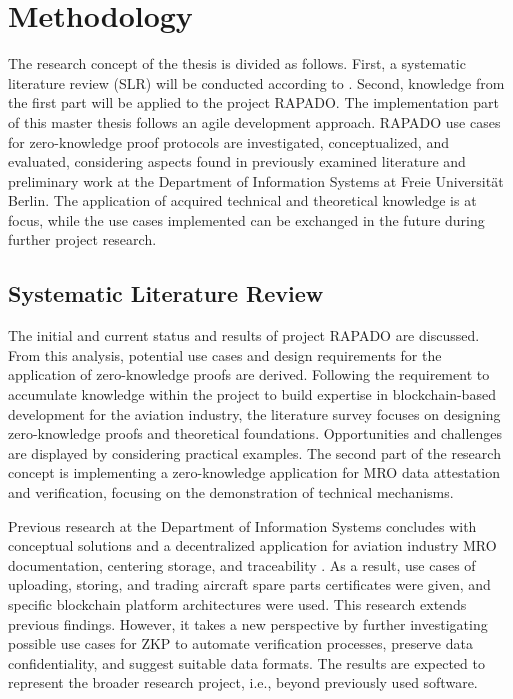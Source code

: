 \chapter{Methodology}
The research concept of the thesis is divided as follows. First, a systematic literature review (SLR) will be conducted according to \cite{vomBrockeJan2019TDgs, Webster2002AnalyzingTP}. Second, knowledge from the first part will be applied to the project RAPADO. The implementation part of this master thesis follows an agile development approach. RAPADO use cases for zero-knowledge proof protocols are investigated, conceptualized, and evaluated, considering aspects found in previously examined literature and preliminary work at the Department of Information Systems at Freie Universit{\"a}t Berlin. The application of acquired technical and theoretical knowledge is at focus, while the use cases implemented can be exchanged in the future during further project research. 

\section{Systematic Literature Review}
The initial and current status and results of project RAPADO are discussed. From this analysis, potential use cases and design requirements for the application of zero-knowledge proofs are derived. Following the requirement to accumulate knowledge within the project to build expertise in blockchain-based development for the aviation industry, the literature survey focuses on designing zero-knowledge proofs and theoretical foundations. Opportunities and challenges are displayed by considering practical examples. The second part of the research concept is implementing a zero-knowledge application for MRO data attestation and verification, focusing on the demonstration of technical mechanisms.

Previous research at the Department of Information Systems concludes with conceptual solutions and a decentralized application for aviation industry MRO documentation, centering storage, and traceability \citep{ZedelJ}. As a result, use cases of uploading, storing, and trading aircraft spare parts certificates were given, and specific blockchain platform architectures were used. This research extends previous findings. However, it takes a new perspective by further investigating possible use cases for ZKP to automate verification processes, preserve data confidentiality, and suggest suitable data formats. The results are expected to represent the broader research project, i.e., beyond previously used software.

